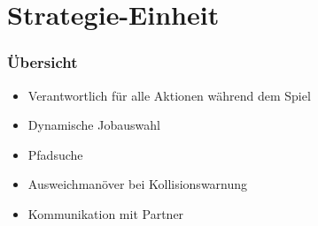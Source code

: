 \section{Strategie-Einheit}

\begin{frame}
	\frametitle{Übersicht}
	
	\begin{itemize}
		\item Verantwortlich für alle Aktionen während dem Spiel
		\item Dynamische Jobauswahl
		\item Pfadsuche
		\item Ausweichmanöver bei Kollisionswarnung
		\item Kommunikation mit Partner
	\end{itemize}
	
\end{frame}

